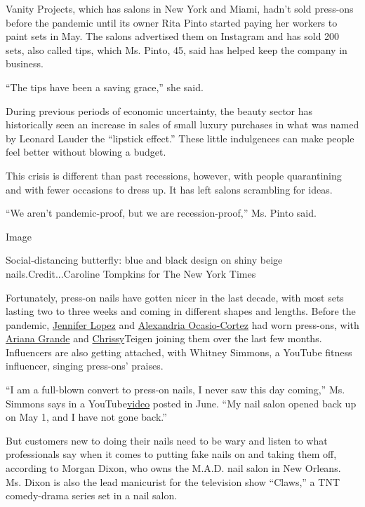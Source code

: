 Vanity Projects, which has salons in New York and Miami, hadn't sold
press-ons before the pandemic until its owner Rita Pinto started paying
her workers to paint sets in May. The salons advertised them on
Instagram and has sold 200 sets, also called tips, which Ms. Pinto, 45,
said has helped keep the company in business.

``The tips have been a saving grace,'' she said.

During previous periods of economic uncertainty, the beauty sector has
historically seen an increase in sales of small luxury purchases in what
was named by Leonard Lauder the ``lipstick effect.'' These little
indulgences can make people feel better without blowing a budget.

This crisis is different than past recessions, however, with people
quarantining and with fewer occasions to dress up. It has left salons
scrambling for ideas.

``We aren't pandemic-proof, but we are recession-proof,'' Ms. Pinto
said.

Image

Social-distancing butterfly: blue and black design on shiny beige
nails.Credit...Caroline Tompkins for The New York Times

Fortunately, press-on nails have gotten nicer in the last decade, with
most sets lasting two to three weeks and coming in different shapes and
lengths. Before the pandemic,
\href{https://www.instyle.com/beauty/nails/best-press-on-nails-tips-jennifer-lopez-manicurist}{Jennifer
Lopez} and
\href{https://www.allure.com/story/alexandria-ocasio-cortez-impress-press-on-manicure-amtrak}{Alexandria
Ocasio-Cortez} had worn press-ons, with
\href{https://www.allure.com/story/ariana-grande-milky-press-on-nails}{Ariana
Grande} and
\href{https://www.allure.com/story/chrissy-teigen-press-on-nails-at-home}{Chrissy}Teigen
joining them over the last few months. Influencers are also getting
attached, with Whitney Simmons, a YouTube fitness influencer, singing
press-ons' praises.

``I am a full-blown convert to press-on nails, I never saw this day
coming,'' Ms. Simmons says in a
YouTube\href{https://www.youtube.com/watch?v=3h61TWqyD4s}{video} posted
in June. ``My nail salon opened back up on May 1, and I have not gone
back.''

But customers new to doing their nails need to be wary and listen to
what professionals say when it comes to putting fake nails on and taking
them off, according to Morgan Dixon, who owns the M.A.D. nail salon in
New Orleans. Ms. Dixon is also the lead manicurist for the television
show ``Claws,'' a TNT comedy-drama series set in a nail salon.

